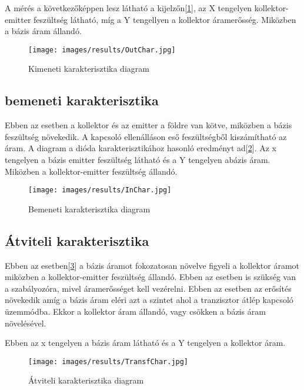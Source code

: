A mérés a következőképpen lesz látható a kijelzőn[\ref{fig:OutChar}],
az X tengelyen kollektor-emitter feszültség látható, míg a Y tengellyen
a kollektor áramerősség. Miközben a bázis áram állandó.

\begin{figure}[H]
    \centering
    \texttt{[image: images/results/OutChar.jpg]}
    \caption{Kimeneti karakterisztika diagram}
    \label{fig:OutChar}
\end{figure}

\subsection{bemeneti karakterisztika}

Ebben az esetben a kollektor és az emitter a földre van kötve,
miközben a bázis feszültség növekedik. A kapcsoló ellenálláson eső feszültségből
kiszámítható az áram. A diagram a dióda karakterisztikához hasonló eredményt
ad[\ref{fig:InChar}]. Az x tengelyen a bázis emitter feszültség látható és
a Y tengelyen abázis áram. Miközben a kollektor-emitter feszültség állandó.

\begin{figure}[H]
    \centering
    \texttt{[image: images/results/InChar.jpg]}
    \caption{Bemeneti karakterisztika diagram}
    \label{fig:InChar}
\end{figure}

\subsection{Átviteli karakterisztika}

Ebben az esetben[\ref{fig:transfChar}]  a bázis áramot fokozatosan növelve figyeli a kollektor
áramot miközben a kollektor-emitter feszültség állandó.
Ebben az esetben is szükség van a szabályozóra, mivel áramerősséget kell
vezérelni. Ebben az esetben az erősítés növekedik amíg a bázis
áram eléri azt a szintet ahol a tranzisztor átlép kapcsoló
üzemmódba. Ekkor a kollektor áram állandó, vagy csökken a bázis áram
növelésével.

Ebben az x tengelyen a bázis áram látható és a Y tengelyen a kollektor áram.

\begin{figure}[H]
    \centering
    \texttt{[image: images/results/TransfChar.jpg]}
    \caption{Átviteli karakterisztika diagram}
    \label{fig:transfChar}
\end{figure}


